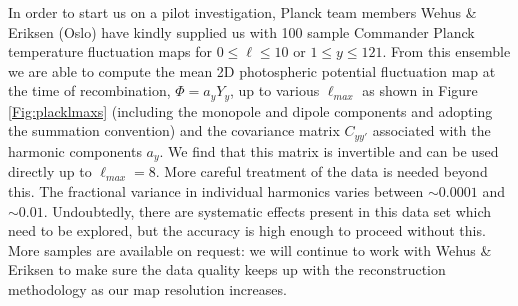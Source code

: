 \documentclass[psfig,12pt]{article}
\begin{document}
In order to start us on a pilot investigation, Planck team members Wehus \&
Eriksen  (Oslo) have kindly supplied us with 100 sample Commander Planck temperature
fluctuation maps for $0\le\ell\le10$ or $1\le y\le121$. From this
ensemble we are able to compute the mean 2D photospheric potential
fluctuation map at the time of recombination, $\Phi=a_yY_y$, up to various $\ell_{max}$ as shown in Figure \ref{Fig:placklmaxs} (including
the monopole and dipole components and adopting the summation
convention) and the covariance matrix $C_{yy'}$ associated with the
harmonic components $a_y$. We find that this matrix is invertible and
can be used directly up to $\ell_{max}=8$. More careful treatment of the data
is needed beyond this. The fractional variance in individual harmonics
varies between $\sim0.0001$ and $\sim0.01$. Undoubtedly, there are
systematic effects present in this data set which need to be explored,
but the accuracy is high enough to proceed without this.
More samples are available on request: we will continue to work with
Wehus \& Eriksen to make sure the data quality keeps up with the
reconstruction methodology as our map resolution increases.
\end{document}
